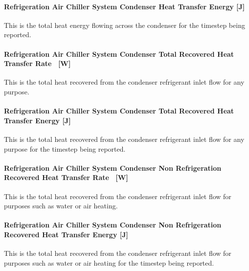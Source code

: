\paragraph{Refrigeration Air Chiller System Condenser Heat Transfer Energy {[}J{]}}\label{refrigeration-air-chiller-system-condenser-heat-transfer-energy-j-1}

This is the total heat energy flowing across the condenser for the timestep being reported.

\paragraph{Refrigeration Air Chiller System Condenser Total Recovered Heat Transfer Rate~ {[}W{]}}\label{refrigeration-air-chiller-system-condenser-total-recovered-heat-transfer-rate-w-1}

This is the total heat recovered from the condenser refrigerant inlet flow for any purpose.

\paragraph{Refrigeration Air Chiller System Condenser Total Recovered Heat Transfer Energy {[}J{]}}\label{refrigeration-air-chiller-system-condenser-total-recovered-heat-transfer-energy-j-1}

This is the total heat recovered from the condenser refrigerant inlet flow for any purpose for the timestep being reported.

\paragraph{Refrigeration Air Chiller System Condenser Non Refrigeration Recovered Heat Transfer Rate~ {[}W{]}}\label{refrigeration-air-chiller-system-condenser-non-refrigeration-recovered-heat-transfer-rate-w-1}

This is the total heat recovered from the condenser refrigerant inlet flow for purposes such as water or air heating.

\paragraph{Refrigeration Air Chiller System Condenser Non Refrigeration Recovered Heat Transfer Energy {[}J{]}}\label{refrigeration-air-chiller-system-condenser-non-refrigeration-recovered-heat-transfer-energy-j-1}

This is the total heat recovered from the condenser refrigerant inlet flow for purposes such as water or air heating for the timestep being reported.

